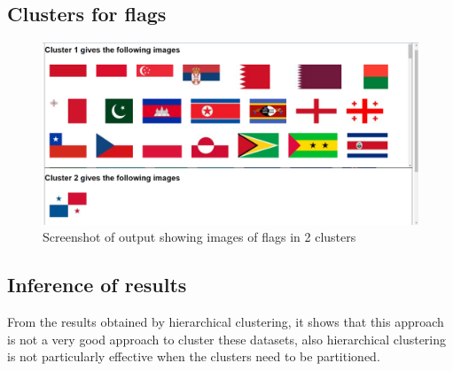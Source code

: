 \documentclass[a4paper]{article}
\begin{document}
\subsection{Clusters for flags}
\begin{figure}[H]
\centering
\includegraphics[width=1\textwidth]{flags.PNG}
\caption{Screenshot of output showing images of flags in 2 clusters}\label{
}
\end{figure}
\subsection{Inference of results}
From the results obtained by hierarchical clustering, it shows that this approach is not a very good approach to cluster these datasets, also hierarchical clustering is not particularly effective when the clusters need to be partitioned. 
\end{document}

